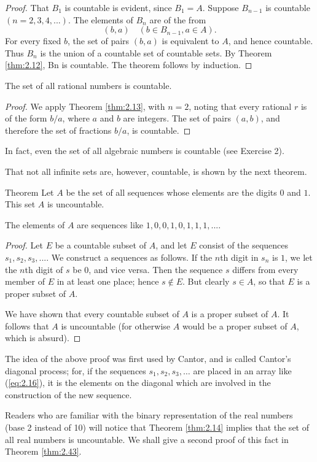 \begin{proof}
    That $B_1$ is countable is evident, since $B_1 = A$. 
    Suppose $B_{n-1}$ is countable $(n = 2, 3, 4, ... )$. 
    The elements of $B_n$ are of the from
    \begin{equation}
        \label{eq:2.18}
        (b,a)
        \quad
        (b \in B_{n-1},a \in A).
    \end{equation}
    For every fixed $b$, the set of pairs $(b, a)$ is equivalent to $A$, and hence countable. 
    Thus $B_n$ is the union of a countable set of countable sets. 
    By Theorem \ref{thm:2.12}, Bn is countable.
The theorem follows by induction.
\end{proof}

\begin{myCorollary*}
    The set of all rational numbers is countable.
\end{myCorollary*}

\begin{proof}
    We apply Theorem \ref{thm:2.13}, 
    with $n = 2$, noting that every rational $r$ is of the form $b / a$, 
    where $a$ and $b$ are integers. 
    The set of pairs $(a, b)$, 
    and therefore the set of fractions $b / a$, is countable.
\end{proof}

In fact, even the set of all algebraic numbers is countable (see Exercise 2).

That not all infinite sets are, however, countable, is shown by the next
theorem.

\begin{thm}
    \label{thm:2.14}
    Theorem Let $A$ be the set of all sequences whose elements are the digits $0$ and $1$. This set $A$ is uncountable. 
\end{thm}

The elements of $A$ are sequences like $1, 0, 0, 1, 0, 1, 1, 1, ... .$

\begin{proof}
    Let $E$ be a countable subset of $A$, 
    and let $E$ consist of the sequences $s_1, s_2 , s_3 , ...$. 
    We construct a sequences as follows. 
    If the $n$th digit in $s_n$ is $1$, 
    we let the $n$th digit of $s$ be $0$, and vice versa. 
    Then the sequence $s$ differs from every member of $E$ in at least one place; hence $s \not\in E$. 
    But clearly $s \in A$, so that $E$ is a proper subset of $A$.

    We have shown that 
    every countable subset of $A$ is a proper subset of $A$. 
    It follows that $A$ is uncountable 
    (for otherwise $A$ would be a proper subset of $A$, which is absurd).
\end{proof}

The idea of the above proof was first used by Cantor, 
and is called Cantor's diagonal process; 
for, if the sequences $s_1, s_2 , s_3 ,\dots$ are placed in an array like (\ref{eq:2.16}), 
it is the elements on the diagonal which are involved in the construction of the new sequence.

Readers who are familiar with the binary representation of the real numbers (base 2 instead of 10) will notice that 
Theorem \ref{thm:2.14} implies that the set of all real numbers is uncountable. 
We shall give a second proof of this fact in Theorem \ref{thm:2.43}.